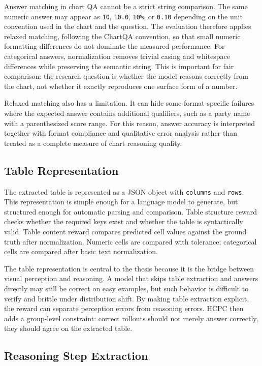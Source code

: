\documentclass{iutbscthesis}
\begin{document}
Answer matching in chart QA cannot be a strict string comparison. The same numeric answer may appear as \texttt{10}, \texttt{10.0}, \texttt{10\%}, or \texttt{0.10} depending on the unit convention used in the chart and the question. The evaluation therefore applies relaxed matching, following the ChartQA convention, so that small numeric formatting differences do not dominate the measured performance. For categorical answers, normalization removes trivial casing and whitespace differences while preserving the semantic string. This is important for fair comparison: the research question is whether the model reasons correctly from the chart, not whether it exactly reproduces one surface form of a number.

Relaxed matching also has a limitation. It can hide some format-specific failures where the expected answer contains additional qualifiers, such as a party name with a parenthesized score range. For this reason, answer accuracy is interpreted together with format compliance and qualitative error analysis rather than treated as a complete measure of chart reasoning quality.

\subsection{Table Representation}

The extracted table is represented as a JSON object with \texttt{columns} and \texttt{rows}. This representation is simple enough for a language model to generate, but structured enough for automatic parsing and comparison. Table structure reward checks whether the required keys exist and whether the table is syntactically valid. Table content reward compares predicted cell values against the ground truth after normalization. Numeric cells are compared with tolerance; categorical cells are compared after basic text normalization.

The table representation is central to the thesis because it is the bridge between visual perception and reasoning. A model that skips table extraction and answers directly may still be correct on easy examples, but such behavior is difficult to verify and brittle under distribution shift. By making table extraction explicit, the reward can separate perception errors from reasoning errors. HCPC then adds a group-level constraint: correct rollouts should not merely answer correctly, they should agree on the extracted table.

\subsection{Reasoning Step Extraction}
\end{document}
